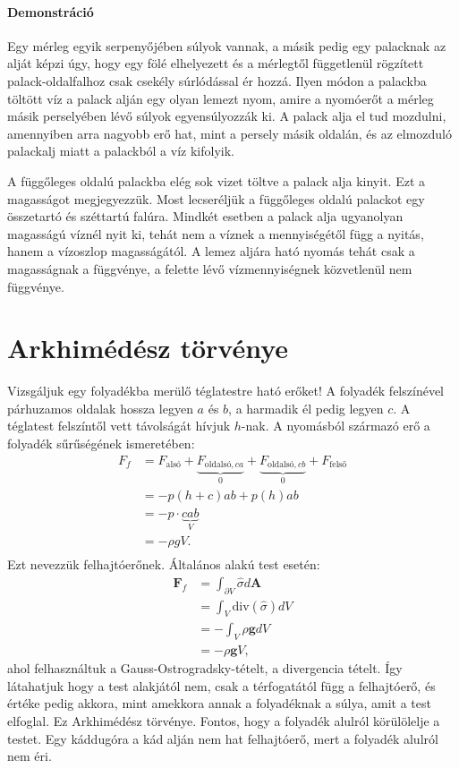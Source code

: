 \documentclass[12pt,a4paper]{scrartcl}
\let\mathbf\bm
\begin{document}
\paragraph{Demonstráció} Egy mérleg egyik serpenyőjében súlyok vannak, a másik pedig egy palacknak az alját képzi úgy, hogy egy fölé elhelyezett és a mérlegtől függetlenül rögzített palack-oldalfalhoz csak csekély súrlódással ér hozzá. Ilyen módon a palackba töltött víz a palack alján egy olyan lemezt nyom, amire a nyomóerőt a mérleg másik perselyében lévő súlyok egyensúlyozzák ki. A palack alja el tud mozdulni, amennyiben arra nagyobb erő hat, mint a persely másik oldalán, és az elmozduló palackalj miatt a palackból a víz kifolyik.

A függőleges oldalú palackba elég sok vizet töltve a palack alja kinyit. Ezt a magasságot megjegyezzük. Most lecseréljük a függőleges oldalú palackot egy összetartó és széttartú falúra. Mindkét esetben a palack alja ugyanolyan magasságú víznél nyit ki, tehát nem a víznek a mennyiségétől függ a nyitás, hanem a vízoszlop magasságától. A lemez aljára ható nyomás tehát csak a magasságnak a függvénye, a felette lévő vízmennyiségnek közvetlenül nem függvénye.
\normalsize

\section{Arkhimédész törvénye}
Vizsgáljuk egy folyadékba merülő téglatestre ható erőket! A folyadék felszínével párhuzamos oldalak hossza legyen $a$ és $b$, a harmadik él pedig legyen $c$. A téglatest felszíntől vett távolságát hívjuk $h$-nak. A nyomásból származó erő a folyadék sűrűségének ismeretében:
\[\begin{aligned}
  F_f &  = {F_{\text{alsó}}} + \underbrace {{F_{\text{oldalsó},ca}}}_0 + \underbrace {{F_{\text{oldalsó},cb}}}_0 + {F_{\text{felső}}} \\ 
   &  = - p\left( {h + c} \right)ab + p\left( h \right)ab \\ 
   &  = - p \cdot \underbrace {cab}_V \\
   &  = - \rho gV. \\ 
\end{aligned} \]
Ezt nevezzük felhajtóerőnek. Általános alakú test esetén:
\[\begin{aligned}
  {{\mathbf{F}}_f} &  = \int_{\partial V} {\hat \sigma d{\mathbf{A}}}  \\ 
   &  = \int_V {{\text{div}}\left( {\hat \sigma } \right)dV}  \\ 
   &  =  - \int_V {\rho {\mathbf{g}}dV}  \\ 
   &  =  - \rho {\mathbf{g}}V,
\end{aligned} \]
ahol felhasználtuk a Gauss-Ostrogradsky-tételt, a divergencia tételt.
Így látahatjuk hogy a test alakjától nem, csak a térfogatától függ a felhajtóerő, és értéke pedig akkora, mint amekkora annak a folyadéknak a súlya, amit a test elfoglal. Ez Arkhimédész törvénye. Fontos, hogy a folyadék alulról körülölelje a testet. Egy káddugóra a kád alján nem hat felhajtóerő, mert a folyadék alulról nem éri.
\end{document}
